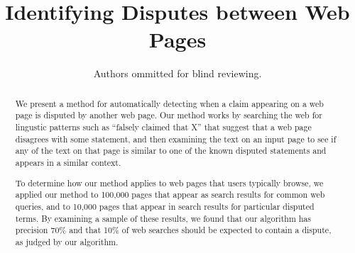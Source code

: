 \documentclass{acm_proc_article-sp}
\begin{document}
\title{Identifying Disputes between Web Pages}



\newcommand{\needed}[1]{{\color{red}#1}}
\newcommand{\want}[1]{}
\newcommand{\todo}[1]{}
\newcommand{\idea}[1]{}
\newcommand{\node}[1]{}


\author{
    Authors ommitted for blind reviewing.
}

\maketitle


\begin{abstract}
We present a method for automatically detecting when a claim appearing on a web page is disputed by another web page. Our method works by searching the web for lingustic patterns such as ``falsely claimed that X'' that suggest that a web page disagrees with some statement, and then examining the text on an input page to see if any of the text on that page is similar to one of the known disputed statements and appears in a similar context.

To determine how our method applies to web pages that users typically browse, we applied our method to \needed{100,000} pages that appear as search results for common web queries, and to \needed{10,000} pages that appear in search results for particular disputed terms. By examining a sample of these results, we found that our algorithm has precision \needed{70\%} and that \needed{10\%} of web searches should be expected to contain a dispute, as judged by our algorithm. 
\end{abstract}
\end{document}
